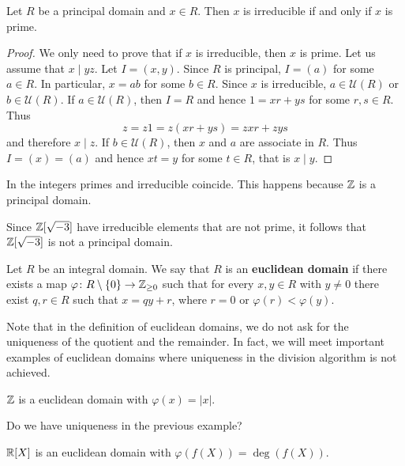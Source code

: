 \begin{proposition}
\label{pro:PID:irreducible=prime}
	Let $R$ be a principal domain and $x\in R$. 
	Then $x$ is irreducible if and only if $x$ is prime. 	
\end{proposition}

\begin{proof}
	We only need to prove that if $x$ is irreducible, then $x$ is prime. Let us
	assume that $x\mid yz$. Let $I=(x,y)$. Since $R$ is principal, $I=(a)$ for some $a\in R$. In particular, $x=ab$ for some $b\in R$. Since $x$ is irreducible, $a\in\mathcal{U}(R)$ or
	$b\in\mathcal{U}(R)$. If $a\in\mathcal{U}(R)$, then $I=R$ and hence 
	$1=xr+ys$ for some $r,s\in R$. Thus
	\[
	z=z1=z(xr+ys)=zxr+zys
	\]
	and therefore $x\mid z$. If $b\in\mathcal{U}(R)$, then $x$ and $a$ are associate
	in $R$. Thus $I=(x)=(a)$ and hence $xt=y$ for some $t\in R$, that is $x\mid y$.  
\end{proof}

In the integers primes and irreducible coincide. This happens 
because $\mathbb{Z}$ is a principal domain.

\begin{example}
	Since $\mathbb{Z}[\sqrt{-3}]$ have irreducible elements that are not prime, it follows that
	$\mathbb{Z}[\sqrt{-3}]$ is not a principal domain.
\end{example}

\begin{definition}
	Let $R$ be an integral domain. We say that $R$ is an \textbf{euclidean domain}
	if there exists a map $\varphi\colon R\setminus\{0\}\to\mathbb{Z}_{\geq0}$ such that
	for every $x,y\in R$ with $y\ne 0$ there exist $q,r\in R$ such that 
	$x=qy+r$, where $r=0$ or $\varphi(r)<\varphi(y)$. 
\end{definition}

Note that in the definition of euclidean domains, we do not ask for the uniqueness 
of the quotient and the remainder. In fact, 
we will meet important examples of euclidean domains where uniqueness
in the division algorithm is not achieved. 

\begin{example}
	$\mathbb{Z}$ is a euclidean domain with $\varphi(x)=|x|$.
\end{example}

Do we have uniqueness in the previous example? 	

\begin{example}
	$\mathbb{R}[X]$ is an euclidean domain with $\varphi(f(X))=\deg(f(X))$. 	
\end{example}

